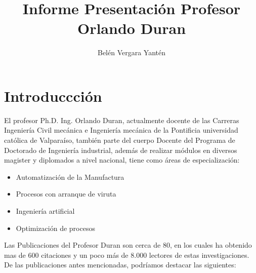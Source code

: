 \documentclass[]{article}
\title{Informe Presentación Profesor Orlando Duran}
\author{Belén Vergara Yantén}
\affil[1]{Industrial PhD Program; School of Industrial Engineering; Pontificia Universidad Católica
de Valparaíso.}
\date{}
\begin{document}
\maketitle




\hypertarget{introducccion-descripcion-general}{
\section{Introduccción }
\label{introducccion-descripcion-general}}

El profesor Ph.D. Ing. Orlando Duran, actualmente docente de las Carreras Ingeniería Civil mecánica e Ingeniería mecánica de la Pontificia universidad católica de Valparaíso, también parte del cuerpo Docente del Programa de Doctorado de Ingeniería industrial, además de realizar módulos en diversos magister y diplomados a nivel nacional, tiene como áreas de especialización:

\begin{itemize}
    \item 	Automatización de la Manufactura 
    \item	Procesos con arranque de viruta
    \item   Ingeniería artificial
    \item	Optimización de procesos 
\end{itemize}

Las Publicaciones del Profesor Duran son cerca de 80, en los cuales ha obtenido mas de 600 citaciones y un poco más de 8.000 lectores de estas investigaciones. De las publicaciones antes mencionadas, podríamos destacar las siguientes:
\end{document}
